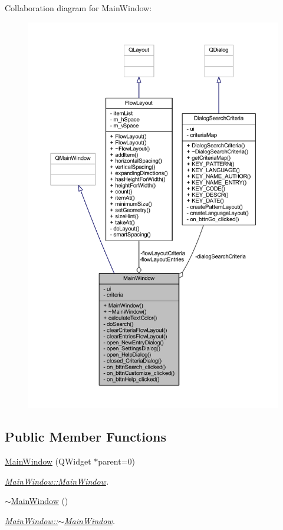 Collaboration diagram for Main\+Window\+:
\nopagebreak
\begin{figure}[H]
\begin{center}
\leavevmode
\includegraphics[width=350pt]{class_main_window__coll__graph}
\end{center}
\end{figure}
\subsection*{Public Member Functions}
\begin{DoxyCompactItemize}
\item 
\hyperlink{class_main_window_a8b244be8b7b7db1b08de2a2acb9409db}{Main\+Window} (Q\+Widget $\ast$parent=0)
\begin{DoxyCompactList}\small\item\em \hyperlink{class_main_window_a8b244be8b7b7db1b08de2a2acb9409db}{Main\+Window\+::\+Main\+Window}. \end{DoxyCompactList}\item 
\hyperlink{class_main_window_ae98d00a93bc118200eeef9f9bba1dba7}{$\sim$\+Main\+Window} ()
\begin{DoxyCompactList}\small\item\em \hyperlink{class_main_window_ae98d00a93bc118200eeef9f9bba1dba7}{Main\+Window\+::$\sim$\+Main\+Window}. \end{DoxyCompactList}\end{DoxyCompactItemize}
